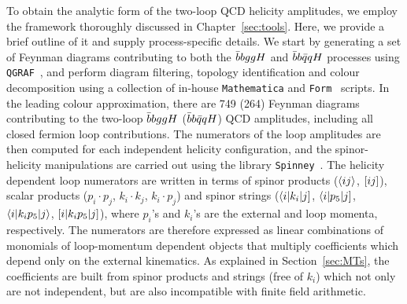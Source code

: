 \documentclass[main.tex]{subfiles}
\begin{document}
To obtain the analytic form of the two-loop QCD helicity amplitudes, we employ the framework thoroughly discussed in Chapter~\ref{sec:tools}. Here, we provide a brief outline of it and supply process-specific details. We start by generating a set of Feynman diagrams contributing to 
both the $\bar{b}bggH$ and $\bar{b}b\bar{q}qH$ processes using \texttt{QGRAF}~\cite{Nogueira:1991ex}, and perform diagram filtering, topology identification and colour decomposition using a collection of in-house \texttt{Mathematica} and \texttt{Form}~\cite{Kuipers:2012rf,Ruijl:2017dtg} scripts.  In the leading colour approximation, there are 749 (264) Feynman diagrams contributing to the two-loop $\bar{b}bggH$ ($\bar{b}b\bar{q}qH$) QCD amplitudes, including all closed fermion loop contributions. The numerators of the loop amplitudes are then computed for each independent helicity configuration, and the spinor-helicity manipulations are carried out using the library \texttt{Spinney}~\cite{Cullen:2010jv}. The helicity dependent loop numerators are written in terms of spinor products ($\langle ij\rangle$, $[ij]$), scalar products ($p_i\cdot p_j$, $k_i\cdot k_j$, $k_i \cdot p_j$) and spinor strings ($\langle i|k_i|j]$, $\langle i|p_5|j]$, $\langle i|k_i p_5|j\rangle$, $[i|k_i p_5|j]$), where $p_i$'s and $k_i$'s are the external and loop momenta, respectively. The numerators are therefore expressed as linear combinations of monomials of loop-momentum dependent objects that multiply coefficients which depend only on the external kinematics.
As explained in Section~\ref{sec:MTs}, the coefficients are built from spinor products and strings (free of $k_i$) which not only are not independent, but are also incompatible with finite field arithmetic.
\end{document}
